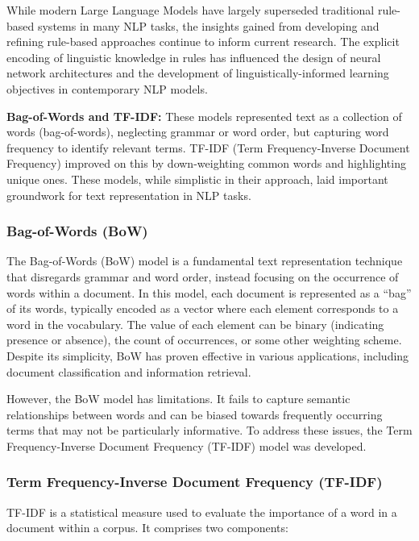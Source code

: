 While modern Large Language Models have largely superseded traditional rule-based systems in many NLP tasks, the insights gained from developing and refining rule-based approaches continue to inform current research. The explicit encoding of linguistic knowledge in rules has influenced the design of neural network architectures and the development of linguistically-informed learning objectives in contemporary NLP models.

\textbf{Bag-of-Words and TF-IDF:} These models represented text as a collection of words (bag-of-words), neglecting grammar or word order, but capturing word frequency to identify relevant terms. TF-IDF (Term Frequency-Inverse Document Frequency) improved on this by down-weighting common words and highlighting unique ones. These models, while simplistic in their approach, laid important groundwork for text representation in NLP tasks.

\subsubsection{Bag-of-Words (BoW)}
The Bag-of-Words (BoW) model is a fundamental text representation technique that disregards grammar and word order, instead focusing on the occurrence of words within a document. In this model, each document is represented as a ``bag'' of its words, typically encoded as a vector where each element corresponds to a word in the vocabulary. The value of each element can be binary (indicating presence or absence), the count of occurrences, or some other weighting scheme. Despite its simplicity, BoW has proven effective in various applications, including document classification and information retrieval.

However, the BoW model has limitations. It fails to capture semantic relationships between words and can be biased towards frequently occurring terms that may not be particularly informative. To address these issues, the Term Frequency-Inverse Document Frequency (TF-IDF) model was developed.

\subsubsection{Term Frequency-Inverse Document Frequency (TF-IDF)}
TF-IDF is a statistical measure used to evaluate the importance of a word in a document within a corpus. It comprises two components:

